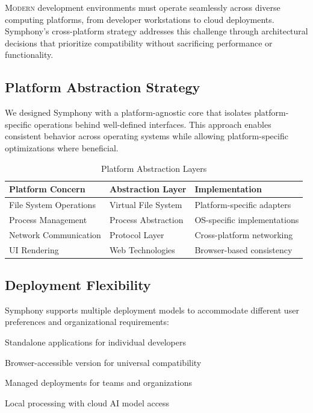 
\lettrine{M}{odern} development environments must operate seamlessly across diverse computing platforms, from developer workstations to cloud deployments. Symphony's cross-platform strategy addresses this challenge through architectural decisions that prioritize compatibility without sacrificing performance or functionality.

\subsection*{Platform Abstraction Strategy}

We designed Symphony with a \textcolor{brandPrimary}{platform-agnostic core} that isolates platform-specific operations behind well-defined interfaces. This approach enables consistent behavior across operating systems while allowing platform-specific optimizations where beneficial.

\begin{table}[ht]
\centering
\begin{tabular}{@{}lll@{}}
\toprule
\textbf{Platform Concern} & \textbf{Abstraction Layer} & \textbf{Implementation} \\
\midrule
File System Operations & Virtual File System & Platform-specific adapters \\
Process Management & Process Abstraction & OS-specific implementations \\
Network Communication & Protocol Layer & Cross-platform networking \\
UI Rendering & Web Technologies & Browser-based consistency \\
\bottomrule
\end{tabular}
\caption{Platform Abstraction Layers}
\end{table}

\subsection*{Deployment Flexibility}

Symphony supports multiple deployment models to accommodate different user preferences and organizational requirements:

\begin{description}[leftmargin=3cm,labelwidth=2.5cm]
    \item[\textbf{Desktop Native}] Standalone applications for individual developers
    \item[\textbf{Web-Based}] Browser-accessible version for universal compatibility
    \item[\textbf{Cloud Hosted}] Managed deployments for teams and organizations
    \item[\textbf{Hybrid}] Local processing with cloud AI model access
\end{description}

